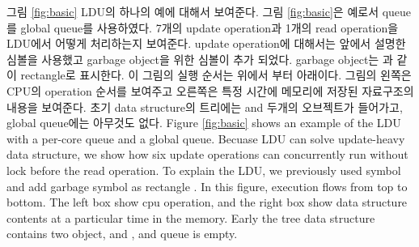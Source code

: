 %
\ifkor
그림 \ref{fig:basic} LDU의 하나의 예에 대해서 보여준다. 그림 \ref{fig:basic}은 예로서 queue를 global
queue를 사용하였다. 
7개의 update operation과 1개의 read operation을 LDU에서 어떻게 처리하는지 보여준다.
update operation에 대해서는 앞에서 설명한 심볼을 사용했고 garbage object을 위한 심볼이 추가 되었다.
garbage object는 과 같이 rectangle로 표시한다. 
이 그림의 실행 순서는 위에서 부터 아래이다.
그림의 왼쪽은 CPU의 operation 순서를 보여주고 오른쪽은 특정 시간에 메모리에 저장된 자료구조의 내용을 보여준다.
초기 data structure의 트리에는  and  두개의 오브젝트가 들어가고, global
queue에는 아무것도 없다.
\else
Figure \ref{fig:basic} shows an example of the LDU with a per-core queue and
a global queue.
Becuase LDU can solve update-heavy data structure, we show how six update
operations can concurrently run without lock before the read operation.
To explain the LDU, we previously used symbol and add garbage symbol as
rectangle .
In this figure, execution flows from top to bottom.
The left box show cpu operation, and the right box show data structure
contents at a particular time in the memory.
Early the tree data structure contains two object,  and ,
and queue is empty.
\fi

